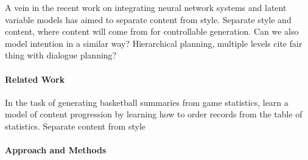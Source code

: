 \documentclass[11pt]{article}
\begin{document}
A vein in the recent work on integrating neural network systems and latent variable models
has aimed to separate content from style.
Separate style and content, where content will come from for controllable generation.
Can we also model intention in a similar way?
Hierarchical planning, multiple levels
cite fair thing with dialogue planning? 

\paragraph{Related Work}
In the task of generating basketball summaries from game statistics,
\citet{puduppully2018contentselection} learn a model of content progression
by learning how to order records from the table of statistics.
\citep{puduppully2018contentselection,wiseman2018template}
Separate content from style
\paragraph{Approach and Methods}
\end{document}
